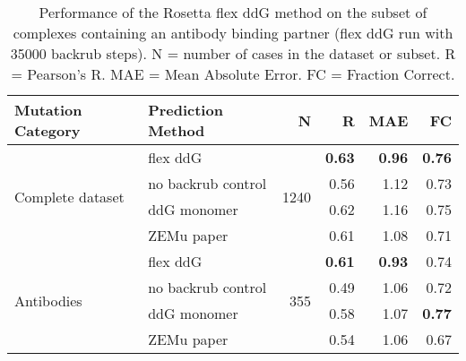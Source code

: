 \begin{table}
  \begin{tabular}{llrrrr}
\toprule
Mutation Category &   Prediction Method &     N &    R &  MAE &   FC \\
\midrule
 \multirow{ 4}{*}{Complete dataset} & flex ddG & \multirow{ 4}{*}{1240} & \textbf{0.63} & \textbf{0.96} & \textbf{0.76}  \\
 & no backrub control & & 0.56 & 1.12 & 0.73  \\
 & ddG monomer & & 0.62 & 1.16 & 0.75  \\
 & ZEMu paper & & 0.61 & 1.08 & 0.71  \\
\hline
 \multirow{ 4}{*}{Antibodies} & flex ddG & \multirow{ 4}{*}{355} & \textbf{0.61} & \textbf{0.93} & 0.74  \\
 & no backrub control & & 0.49 & 1.06 & 0.72  \\
 & ddG monomer & & 0.58 & 1.07 & \textbf{0.77}  \\
 & ZEMu paper & & 0.54 & 1.06 & 0.67  \\
\bottomrule
\end{tabular}
  \caption[Flex ddG performance on antibodies]{
    Performance of the Rosetta flex ddG method on the subset of complexes containing an antibody binding partner (flex ddG run with 35000 backrub steps). N = number of cases in the dataset or subset. R = Pearson's R. MAE = Mean Absolute Error. FC = Fraction Correct.
  } \label{tab:table-antibodies}
\end{table}
